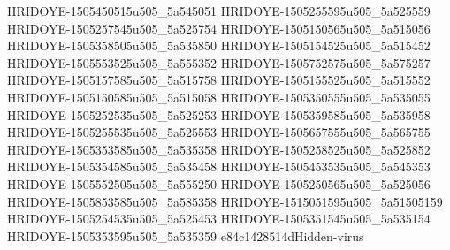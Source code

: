 HRIDOYE-1505450515u505_5a545051
HRIDOYE-1505255595u505_5a525559
HRIDOYE-1505257545u505_5a525754
HRIDOYE-1505150565u505_5a515056
HRIDOYE-1505358505u505_5a535850
HRIDOYE-1505154525u505_5a515452
HRIDOYE-1505553525u505_5a555352
HRIDOYE-1505752575u505_5a575257
HRIDOYE-1505157585u505_5a515758
HRIDOYE-1505155525u505_5a515552
HRIDOYE-1505150585u505_5a515058
HRIDOYE-1505350555u505_5a535055
HRIDOYE-1505252535u505_5a525253
HRIDOYE-1505359585u505_5a535958
HRIDOYE-1505255535u505_5a525553
HRIDOYE-1505657555u505_5a565755
HRIDOYE-1505353585u505_5a535358
HRIDOYE-1505258525u505_5a525852
HRIDOYE-1505354585u505_5a535458
HRIDOYE-1505453535u505_5a545353
HRIDOYE-1505552505u505_5a555250
HRIDOYE-1505250565u505_5a525056
HRIDOYE-1505853585u505_5a585358
HRIDOYE-1515051595u505_5a51505159
HRIDOYE-1505254535u505_5a525453
HRIDOYE-1505351545u505_5a535154
HRIDOYE-1505353595u505_5a535359
e84c1428514dHidden-virus
